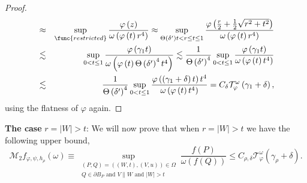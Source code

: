 \documentclass{amsart}
\theoremstyle{plain}
\numberwithin{equation}{section}
\begin{document}
\begin{proof}
\begin{eqnarray*}
&\approx &\sup_{\func{restricted}}\frac{\varphi \left( z\right) }{\omega
\left( \varphi \left( t\right) r^{4}\right) }\approx \sup_{\Theta \left(
\delta ^{\prime }\right) t<r\leq t\leq 1}\frac{\varphi \left( \frac{r}{2}+%
\frac{1}{2}\sqrt{r^{2}+t^{2}}\right) }{\omega \left( \varphi \left( t\right)
r^{4}\right) } \\
&\lesssim &\sup_{0<t\leq 1}\frac{\varphi \left( \gamma _{1}t\right) }{\omega
\left( \varphi \left( t\right) \Theta \left( \delta ^{\prime }\right)
^{4}t^{4}\right) }\lesssim \frac{1}{\Theta \left( \delta ^{\prime }\right)
^{4}}\sup_{0<t\leq 1}\frac{\varphi \left( \gamma _{1}t\right) }{\omega
\left( \varphi \left( t\right) t^{4}\right) } \\
&\lesssim &\frac{1}{\Theta \left( \delta ^{\prime }\right) ^{4}}%
\sup_{0<t\leq 1}\frac{\varphi \left( \left( \gamma _{1}+\delta \right)
t\right) t^{4}}{\omega \left( \varphi \left( t\right) t^{4}\right) }%
=C_{\delta }\mathcal{T}_{\varphi }^{\omega }\left( \gamma _{1}+\delta
\right) ,
\end{eqnarray*}%
using the flatness of $\varphi $ again.
\end{proof}

\textbf{The case }$r=\left\vert W\right\vert >t$: We will now prove that
when $r=\left\vert W\right\vert >t$ we have the following upper bound, 
\begin{equation*}
\mathcal{M}_{2}f_{\varphi ,\psi ,h_{\rho }}\left( \omega \right) \equiv \sup 
_{\substack{ \left( P,Q\right) =\left( \left( W,t\right) ,\left( V,u\right)
\right) \in \Omega  \\ Q\in \partial B_{P}\text{ and }V\parallel W\text{ and 
}\left\vert W\right\vert >t}}\frac{f\left( P\right) }{\omega \left( f\left(
Q\right) \right) }\leq C_{\rho ,\delta }\mathcal{T}_{\varphi }^{\omega
}\left( \gamma _{\rho }+\delta \right) .
\end{equation*}
\end{document}
